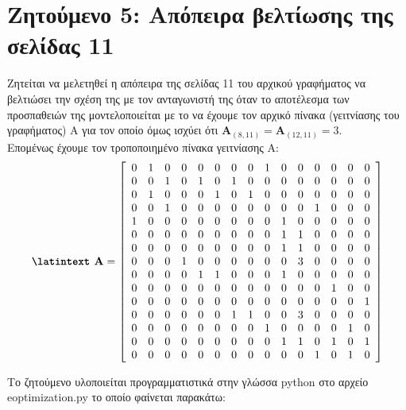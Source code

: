 \documentclass[a4paper,11pt]{article}
\newcommand{\lt}{\latintext}
\begin{document}
\section*{Ζητούμενο 5: Απόπειρα βελτίωσης της σελίδας 11}
Ζητείται να μελετηθεί η απόπειρα της σελίδας 11 του αρχικού γραφήματος να βελτιώσει την σχέση της με τον ανταγωνιστή της όταν το αποτέλεσμα των προσπαθειών της μοντελοποιείται με το να έχουμε τον αρχικό πίνακα (γειτνίασης του γραφήματος) Α για τον οποίο όμως ισχύει ότι {\lt $\textbf{A}_{(8, 11)} = \textbf{A}_{(12, 11)} = 3$}.\\

Επομένως έχουμε τον τροποποιημένο πίνακα γειτνίασης Α:
\[\textbf{{\lt A}}=
    \left[ \begin{array}{ccccccccccccccc}
    0 & 1 & 0 & 0 & 0 & 0 & 0 & 0 & 1 & 0 & 0 & 0 & 0 & 0 & 0 \\
    0 & 0 & 1 & 0 & 1 & 0 & 1 & 0 & 0 & 0 & 0 & 0 & 0 & 0 & 0 \\
    0 & 1 & 0 & 0 & 0 & 1 & 0 & 1 & 0 & 0 & 0 & 0 & 0 & 0 & 0 \\
    0 & 0 & 1 & 0 & 0 & 0 & 0 & 0 & 0 & 0 & 0 & 1 & 0 & 0 & 0 \\
    1 & 0 & 0 & 0 & 0 & 0 & 0 & 0 & 0 & 1 & 0 & 0 & 0 & 0 & 0 \\
    0 & 0 & 0 & 0 & 0 & 0 & 0 & 0 & 0 & 1 & 1 & 0 & 0 & 0 & 0 \\
    0 & 0 & 0 & 0 & 0 & 0 & 0 & 0 & 0 & 1 & 1 & 0 & 0 & 0 & 0 \\
    0 & 0 & 0 & 1 & 0 & 0 & 0 & 0 & 0 & 0 & 3 & 0 & 0 & 0 & 0 \\
    0 & 0 & 0 & 0 & 1 & 1 & 0 & 0 & 0 & 1 & 0 & 0 & 0 & 0 & 0 \\
    0 & 0 & 0 & 0 & 0 & 0 & 0 & 0 & 0 & 0 & 0 & 0 & 1 & 0 & 0 \\
    0 & 0 & 0 & 0 & 0 & 0 & 0 & 0 & 0 & 0 & 0 & 0 & 0 & 0 & 1 \\
    0 & 0 & 0 & 0 & 0 & 0 & 1 & 1 & 0 & 0 & 3 & 0 & 0 & 0 & 0 \\
    0 & 0 & 0 & 0 & 0 & 0 & 0 & 0 & 1 & 0 & 0 & 0 & 0 & 1 & 0 \\
    0 & 0 & 0 & 0 & 0 & 0 & 0 & 0 & 0 & 1 & 1 & 0 & 1 & 0 & 1 \\
    0 & 0 & 0 & 0 & 0 & 0 & 0 & 0 & 0 & 0 & 0 & 1 & 0 & 1 & 0
    \end{array} \right]
\]

Το ζητούμενο υλοποιείται προγραμματιστικά στην γλώσσα {\lt python} στο αρχείο {\lt e\textunderscore optimization.py}  το οποίο φαίνεται παρακάτω:\\
\end{document}
